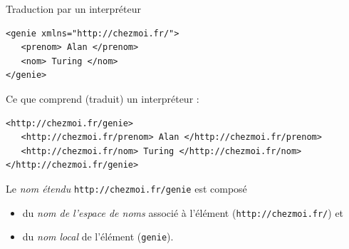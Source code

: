 \begin{frame}[containsverbatim]{Traduction par un interpréteur}

\begin{lstlisting}
<genie xmlns="http://chezmoi.fr/">
   <prenom> Alan </prenom>
   <nom> Turing </nom>
</genie>
\end{lstlisting}

Ce que comprend (traduit) un interpréteur :

\begin{lstlisting}
<http://chezmoi.fr/genie>
   <http://chezmoi.fr/prenom> Alan </http://chezmoi.fr/prenom>
   <http://chezmoi.fr/nom> Turing </http://chezmoi.fr/nom>
</http://chezmoi.fr/genie>
\end{lstlisting}

\bigskip

Le \emph{nom étendu} \verb?http://chezmoi.fr/genie? est composé 
\begin{itemize}
\item du \emph{nom de l'espace de noms} associé à l'élément (\verb?http://chezmoi.fr/?) et 
\item du \emph{nom local} de l'élément (\verb?genie?).
\end{itemize}

\end{frame}


